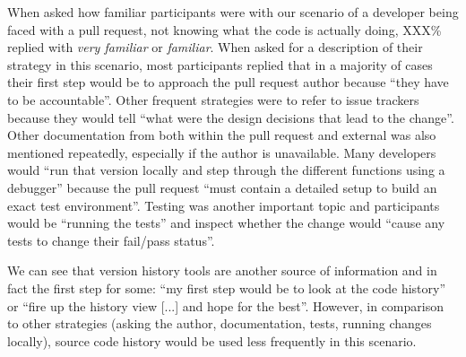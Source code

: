 
When asked how familiar participants were with our scenario of a developer being faced with a pull request, not knowing what the code is actually doing, XXX\% replied with \textit{very familiar} or \textit{familiar}. When asked for a description of their strategy in this scenario, most participants replied that in a majority of cases their first step would be to approach the pull request author because ``they have to be accountable''. Other frequent strategies were to refer to issue trackers because they would tell ``what were the design decisions that lead to the change''. Other documentation from both within the pull request and external was also mentioned repeatedly, especially if the author is unavailable. Many developers would ``run that version locally and step through the different functions using a debugger'' because the pull request ``must contain a detailed setup to build an exact test environment''. Testing was another important topic and participants would be ``running the tests'' and inspect whether the change would ``cause any tests to change their fail/pass status''.

We can see that version history tools are another source of information and in fact the first step for some: ``my first step would be to look at the code history'' or ``fire up the history view [...] and hope for the best''. However, in comparison to other strategies (asking the author, documentation, tests, running changes locally), source code history would be used less frequently in this scenario.




